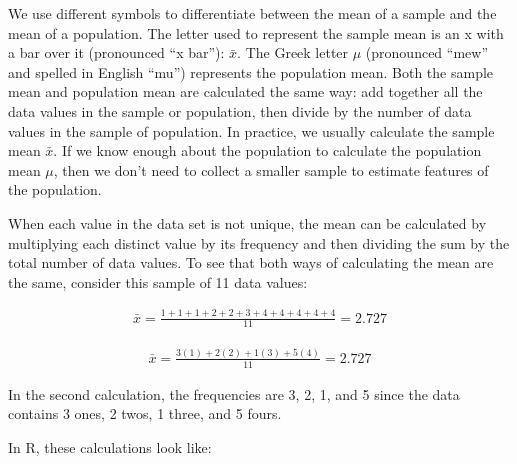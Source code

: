 \documentclass[letterpaper,10pt,english]{jupyterBook}
\begin{document}
\sphinxAtStartPar
We use different symbols to differentiate between the mean of a sample and the mean of a population. The letter used to represent the sample mean is an x with a bar over it (pronounced “x bar”): \(\bar{x}\). The Greek letter \(\mu\) (pronounced “mew” and spelled in English “mu”) represents the population mean. Both the sample mean and population mean are calculated the same way: add together all the data values in the sample or population, then divide by the number of data values in the sample of population. In practice, we usually calculate the sample mean \(\bar{x}\). If we know enough about the population to calculate the population mean \(\mu\), then we don’t need to collect a smaller sample to estimate features of the population.

\sphinxAtStartPar
When each value in the data set is not unique, the mean can be calculated by multiplying each distinct value by its frequency and then dividing the sum by the total number of data values.  To see that both ways of calculating the mean are the same, consider this sample of 11 data values:


\begin{equation*}
\begin{split} \bar{x} = \frac{1 + 1 + 1 + 2 + 2 + 3 + 4 + 4 + 4 + 4 + 4}{11} = 2.727\end{split}
\end{equation*}

\begin{equation*}
\begin{split} \bar{x} = \frac{3(1) + 2(2) + 1(3) + 5(4)}{11} = 2.727\end{split}
\end{equation*}


\sphinxAtStartPar
In the second calculation, the frequencies are 3, 2, 1, and 5 since the data contains 3 ones, 2 twos, 1 three, and 5 fours.

\sphinxAtStartPar
In R, these calculations look like:
\end{document}
